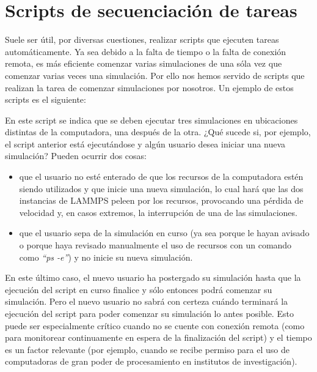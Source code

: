 \label{AD} %


\section{Scripts de secuenciación de tareas}

Suele ser útil, por diversas cuestiones, realizar scripts que ejecuten tareas automáticamente. Ya sea debido a la falta de tiempo o la falta de conexión remota, es más eficiente comenzar varias simulaciones de una sóla vez que comenzar varias veces una simulación. Por ello nos hemos servido de scripts que realizan la tarea de comenzar simulaciones por nosotros. Un ejemplo de estos scripts es el siguiente:



En este script se indica que se deben ejecutar tres simulaciones en ubicaciones distintas de la computadora, una después de la otra. ¿Qué sucede si, por ejemplo, el script anterior está ejecutándose y algún usuario desea iniciar una nueva simulación? Pueden ocurrir dos cosas:

\begin{itemize}
 \item que el usuario no esté enterado de que los recursos de la computadora estén siendo utilizados y que inicie una nueva simulación, lo cual hará que las dos instancias de LAMMPS peleen por los recursos, provocando una pérdida de velocidad y, en casos extremos, la interrupción de una de las simulaciones.
 \item que el usuario sepa de la simulación en curso (ya sea porque le hayan avisado o porque haya revisado manualmente el uso de recursos con un comando como \textit{``ps -e''}) y no inicie su nueva simulación.
\end{itemize}

En este último caso, el nuevo usuario ha postergado su simulación hasta que la ejecución del script en curso finalice y sólo entonces podrá comenzar su simulación. Pero el nuevo usuario no sabrá con certeza cuándo terminará la ejecución del script para poder comenzar su simulación lo antes posible. Esto puede ser especialmente crítico cuando no se cuente con conexión remota (como para monitorear continuamente en espera de la finalización del script) y el tiempo es un factor relevante (por ejemplo, cuando se recibe permiso para el uso de computadoras de gran poder de procesamiento en institutos de investigación).


